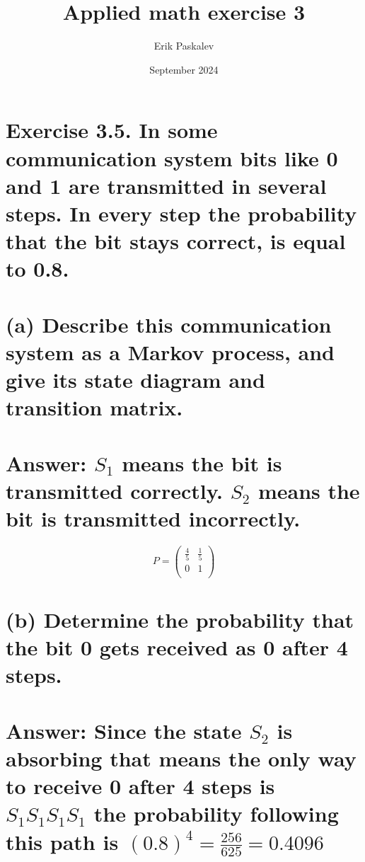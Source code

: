 \documentclass[11px]{article}
\title{Applied math exercise 3}
\author{Erik Paskalev}
\date{September 2024}
\begin{document}
\maketitle

\section*{Exercise 3.5. \normalfont In some communication system bits like 0 and 1 are transmitted in several steps. In every step the probability that the bit stays correct, is equal to 0.8.}

\section*{\normalfont (a) Describe this communication system as a Markov process, and give its state diagram and transition matrix.}

\section*{Answer: $S_1$ means the bit is transmitted correctly. $S_2$ means the bit is transmitted incorrectly.}

\begin{center}
\end{center}

\begin{equation}
P = \begin{pmatrix}
\frac{4}{5} & \frac{1}{5} \\
0 & 1 \\
\end{pmatrix}
\end{equation}

\section*{\normalfont (b) Determine the probability that the bit 0 gets received as 0 after 4 steps.}

\section*{Answer: Since the state $S_2$ is absorbing that means the only way to receive 0 after 4 steps is $S_1S_1S_1S_1$  the probability following this path is ${(0.8)}^4 = \frac{256}{625} = 0.4096$} 
\end{document}
